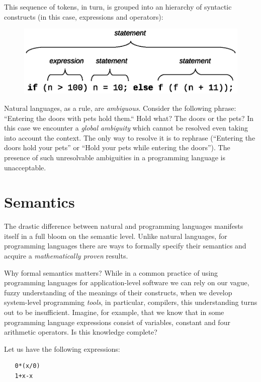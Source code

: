 This sequence of tokens, in turn, is grouped into an hierarchy of syntactic constructs (in this case, expressions and operators):

\begin{figure}[h]
  \centering
  \includegraphics[scale=0.7]{images/01-03.eps}
\end{figure}

Natural languages, as a rule, are \emph{ambiguous}. Consider the following phrase: ``Entering the doors with pets hold them.`` Hold what? The doors or the pets?
In this case we encounter a \emph{global ambiguity} which cannot be resolved even taking into account the context. The only way to resolve it is to
rephrase (``Entering the doors hold your pets'' or ``Hold your pets while entering the doors''). The presence of such unresolvable ambiguities in a
programming language is unacceptable.

\section{Semantics}
\label{intro-semantics}

The drastic difference between natural and programming languages manifests itself in a full bloom on the semantic level. Unlike natural languages,
for programming languages there are ways to formally specify their semantics and acquire a \emph{mathematically proven} results.

Why formal semantics matters? While in a common practice of using programming languages for application-level software we can rely on our vague, fuzzy
understanding of the meanings of their constructs, when we develop system-level programming \emph{tools}, in particular, compilers, this understanding
turns out to be insufficient. Imagine, for example, that we know that in some programming language expressions consist of variables, constant and four
arithmetic operators. Is this knowledge complete?

Let us have the following expressions:

\begin{lstlisting}
   0*(x/0)
   1+x-x
\end{lstlisting}

